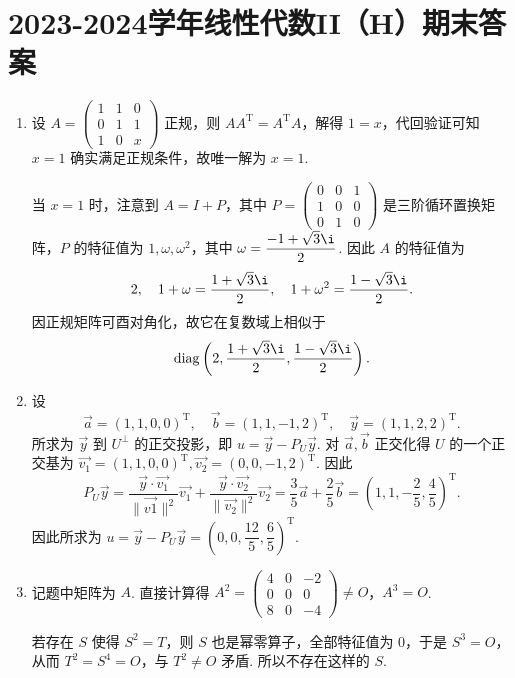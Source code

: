 \section{2023-2024学年线性代数II（H）期末答案}

\begin{enumerate}
    \item 设 $A=\begin{pmatrix}1&1&0\\0&1&1\\1&0&x\end{pmatrix}$ 正规，则 $AA^{\mathrm{T}}=A^{\mathrm{T}}A$，解得 $1=x$，代回验证可知 $x=1$ 确实满足正规条件，故唯一解为 $x=1$.

    当 $x=1$ 时，注意到 $A=I+P$，其中 $P=\begin{pmatrix}0&0&1\\1&0&0\\0&1&0\end{pmatrix}$ 是三阶循环置换矩阵，$P$ 的特征值为 $1,\omega,\omega^2$，其中 $\omega=\dfrac{-1+\sqrt{3}\i}{2}$. 因此 $A$ 的特征值为
    \[
        2,\quad 1+\omega=\frac{1+\sqrt{3}\i}{2},\quad 1+\omega^2=\frac{1-\sqrt{3}\i}{2}.
    \]
    因正规矩阵可酉对角化，故它在复数域上相似于
    \[
        \diag\left(2,\frac{1+\sqrt{3}\i}{2},\frac{1-\sqrt{3}\i}{2}\right).
    \]

    \item 设
    \[
        \vec{a}=(1,1,0,0)^{\mathrm{T}},\quad \vec{b}=(1,1,-1,2)^{\mathrm{T}},\quad \vec{y}=(1,1,2,2)^{\mathrm{T}}.
    \]
    所求为 $\vec{y}$ 到 $U^\perp$ 的正交投影，即 $u=\vec{y}-P_U \vec{y}$. 对 $\vec{a}, \vec{b}$ 正交化得 $U$ 的一个正交基为 $\vec{v_1}=(1,1,0,0)^{\mathrm{T}},\vec{v_2}=(0,0,-1,2)^{\mathrm{T}}$. 因此
    \[
        P_U \vec{y} = \frac{\vec{y}\cdot\vec{v_1}}{\|\vec{v1}\|^2}\vec{v_1} + \frac{\vec{y}\cdot\vec{v_2}}{\|\vec{v_2}\|^2}\vec{v_2} = \frac{3}{5}\vec{a}+\frac{2}{5}\vec{b}=(1,1,-\frac{2}{5},\frac{4}{5})^{\mathrm{T}}.
    \]
    因此所求为 $u=\vec{y}-P_U \vec{y}=\left(0,0,\dfrac{12}{5},\dfrac{6}{5}\right)^{\mathrm{T}}$.

    \item 记题中矩阵为 $A$. 直接计算得 $A^2=\begin{pmatrix}4&0&-2\\0&0&0\\8&0&-4\end{pmatrix}\neq O$，$A^3=O$.

    若存在 $S$ 使得 $S^2=T$，则 $S$ 也是幂零算子，全部特征值为 $0$，于是 $S^3=O$，从而 $T^2=S^4=O$，与 $T^2\neq O$ 矛盾. 所以不存在这样的 $S$.


\end{enumerate}
